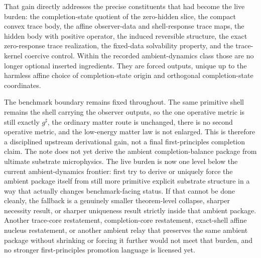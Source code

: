 \documentclass[11pt]{article}
\newcommand{\CompletedMetric}{g^{\sharp}}
\begin{document}
That gain directly addresses the precise constituents that had become the live burden: the completion-state quotient of the zero-hidden slice, the compact convex trace body, the affine observer-data and shell-response trace maps, the hidden body with positive operator, the induced reversible structure, the exact zero-response trace realization, the fixed-data solvability property, and the trace-kernel coercive control. Within the recorded ambient-dynamics class those are no longer optional inserted ingredients. They are forced outputs, unique up to the harmless affine choice of completion-state origin and orthogonal completion-state coordinates.

The benchmark boundary remains fixed throughout. The same primitive shell remains the shell carrying the observer outputs, so the one operative metric is still exactly \(\CompletedMetric\), the ordinary matter route is unchanged, there is no second operative metric, and the low-energy matter law is not enlarged. This is therefore a disciplined upstream derivational gain, not a final first-principles completion claim. The note does not yet derive the ambient completion-balance package from ultimate substrate microphysics. The live burden is now one level below the current ambient-dynamics frontier: first try to derive or uniquely force the ambient package itself from still more primitive explicit substrate structure in a way that actually changes benchmark-facing status. If that cannot be done cleanly, the fallback is a genuinely smaller theorem-level collapse, sharper necessity result, or sharper uniqueness result strictly inside that ambient package. Another trace-core restatement, completion-core restatement, exact-shell affine nucleus restatement, or another ambient relay that preserves the same ambient package without shrinking or forcing it further would not meet that burden, and no stronger first-principles promotion language is licensed yet.
\end{document}
